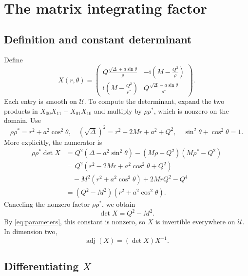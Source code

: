 \documentclass[11pt,a4paper]{article}
\numberwithin{equation}{section}
\theoremstyle{definition}
\theoremstyle{remark}
\newcommand{\I}{\mathrm i}
\newcommand{\adj}{\operatorname{adj}}
\newcommand{\Uext}{\mathcal U}
\newcommand{\mat}[1]{\begin{pmatrix}#1\end{pmatrix}}
\begin{document}
\section{The matrix integrating factor}
\label{sec:integrating}

\subsection{Definition and constant determinant}

Define
\begin{equation}
 X(r,\theta)=
 \mat{
 \displaystyle Q\frac{\sqrt\Delta+a\sin\theta}{\rho}
 &\displaystyle-\I\left(M-\frac{Q^2}{\rho}\right)\\[7pt]
 \displaystyle\I\left(M-\frac{Q^2}{\rho^*}\right)
 &\displaystyle Q\frac{\sqrt\Delta-a\sin\theta}{\rho^*}
}.
\label{eq:X}
\end{equation}
Each entry is smooth on \(\Uext\).  To compute the determinant, expand the
two products in \(X_{00}X_{11}-X_{01}X_{10}\) and multiply by
\(\rho\rho^*\), which is nonzero on the domain.  Use
\[
 \rho\rho^*=r^2+a^2\cos^2\theta,\quad
 (\sqrt\Delta)^2=r^2-2Mr+a^2+Q^2,\quad
 \sin^2\theta+\cos^2\theta=1.
\]
More explicitly, the numerator is
\begin{align*}
 \rho\rho^*\det X
 &=Q^2(\Delta-a^2\sin^2\theta)
   -(M\rho-Q^2)(M\rho^*-Q^2)\\
 &=Q^2(r^2-2Mr+a^2\cos^2\theta+Q^2)\\
 &\quad-M^2(r^2+a^2\cos^2\theta)+2MrQ^2-Q^4\\
 &=(Q^2-M^2)(r^2+a^2\cos^2\theta).
\end{align*}
Canceling the nonzero factor \(\rho\rho^*\), we obtain
\begin{equation}
 \det X=Q^2-M^2.
\label{eq:detX}
\end{equation}
By \eqref{eq:parameters}, this constant is nonzero, so \(X\) is
invertible everywhere on \(\Uext\).  In dimension two,
\begin{equation}
 \adj(X)=(\det X)X^{-1}.
\label{eq:adjX}
\end{equation}

\subsection{Differentiating \texorpdfstring{\(X\)}{X}}
\end{document}
